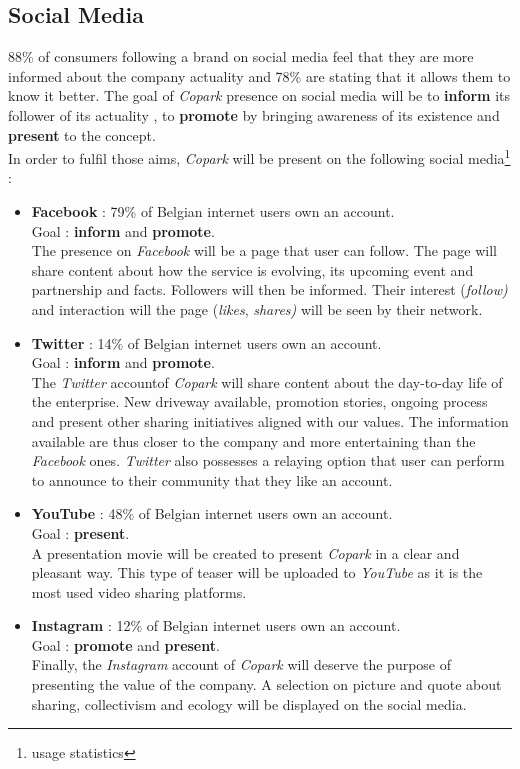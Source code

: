 \documentclass[12pt,a4paper,oneside]{book}
\newcommand{\bp}{\textit{Copark }}
\begin{document}
\subsection{Social Media}
88\% of consumers following a brand on social media feel that they are more informed about the company actuality and  78\% are stating that it allows them to know it better.\cite{sminfo} The goal of \bp presence on social media will be to \textbf{inform} its follower of its actuality , to \textbf{promote} by bringing awareness of its existence and \textbf{present} to the concept.\\
In order to fulfil those aims, \bp will be present on the following social media\footnote{usage statistics\cite{smusage}} :

\begin{itemize}
\item \textbf{Facebook} : 79\% of Belgian internet users own an account.\\Goal : \textbf{inform} and \textbf{promote}.\\
The presence on \textit{Facebook} will be a page that user can follow. The page will share content about how the service is evolving, its upcoming event and partnership and facts. Followers will then be informed. Their interest (\textit{follow)} and interaction will the page (\textit{likes}, \textit{shares)} will be seen by their network. 
\item \textbf{Twitter} : 14\% of Belgian internet users own an account.\\Goal : \textbf{inform} and \textbf{promote}.\\
The \textit{Twitter} accountof \bp will share content about the day-to-day life of the enterprise. New driveway available, promotion stories, ongoing process and present other sharing initiatives aligned with our values. The information available are thus closer to the company and more entertaining than the \textit{Facebook} ones. \textit{Twitter} also possesses a relaying option that user can perform to announce to their community that they like an account.
\item \textbf{YouTube} : 48\% of Belgian internet users own an account.\\Goal : \textbf{present}.\\
A presentation movie will be created to present \bp in a clear and pleasant way. This type of teaser will be uploaded to \textit{YouTube} as it is the most used video sharing platforms.
\item \textbf{Instagram} : 12\% of Belgian internet users own an account.\\Goal : \textbf{promote} and \textbf{present}.\\
Finally, the \textit{Instagram} account of \bp will deserve the purpose of presenting the value of the company. A selection on picture and quote about sharing, collectivism and ecology will be displayed on the social media.
\end{itemize}
\end{document}
